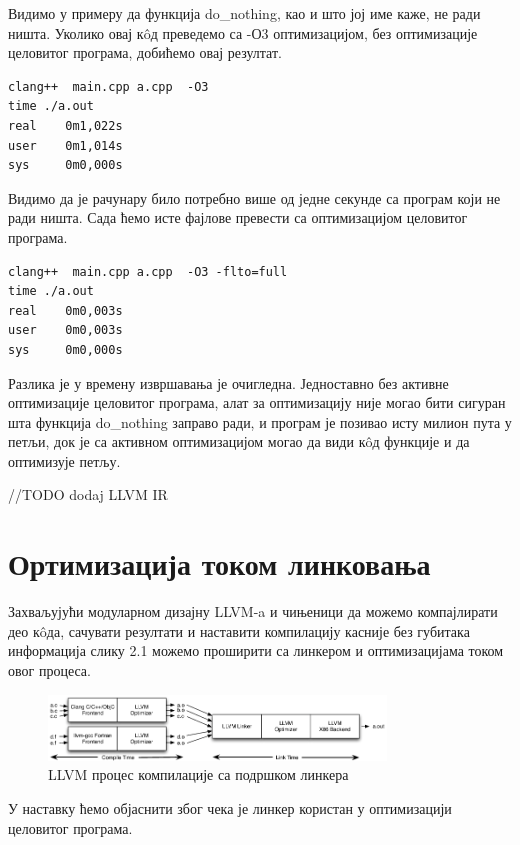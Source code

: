 \documentclass[12pt,oneside]{memoir}
\begin{document}
Видимо у примеру да функција  do{\_}nothing, као и што јој име каже, не ради ништа.
Уколико овај к\^{o}д преведемо са -О3 оптимизацијом, без оптимизације целовитог програма,
добићемо овај резултат.

\begin{lstlisting}
clang++  main.cpp a.cpp  -O3
time ./a.out 
real    0m1,022s
user    0m1,014s
sys     0m0,000s
\end{lstlisting}
Видимо да је рачунару било потребно више од једне секунде са програм који не ради ништа.
Сада ћемо исте фајлове превести са оптимизацијом целовитог програма.
\begin{lstlisting}
clang++  main.cpp a.cpp  -O3 -flto=full
time ./a.out 
real    0m0,003s
user    0m0,003s
sys     0m0,000s
\end{lstlisting}

Разлика је у времену извршавања је очигледна.
Једноставно без активне оптимизације целовитог програма, алат за оптимизацију није могао бити
сигуран шта функција do{\_}nothing заправо ради, и програм је позивао исту милион пута у петљи,
док је са активном оптимизацијом могао да види к\^{o}д функције и да  оптимизује петљу.

//TODO dodaj LLVM IR

\section{Ортимизација током линковања}


Захваљујући модуларном дизајну LLVM-a и чињеници да можемо компајлирати део к\^{o}да,
сачувати резултати и наставити компилацију касније без губитака информација
слику 2.1 можемо проширити са линкером и оптимизацијама током овог процеса.

\begin{figure}[!ht]
  \centering
  \includegraphics[width=0.8\textwidth]{LTO.png}
  \caption{LLVM процес компилације са подршком линкера}
  \label{fig:grafikon}
\end{figure}


У наставку ћемо објаснити због чека је линкер користан у оптимизацији целовитог програма.
\end{document}
